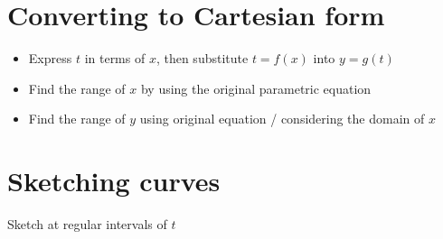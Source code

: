 \section{Converting to Cartesian form}
\begin{itemize}
    \item Express $t$ in terms of $x$, then substitute $t=f(x)$ into $y=g(t)$
    \item Find the range of $x$ by using the original parametric equation
    \item Find the range of $y$ using original equation / considering the domain of $x$
\end{itemize}
\section{Sketching curves}
Sketch at regular intervals of $t$